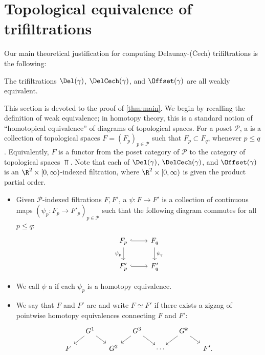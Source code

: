 \section{Topological equivalence of trifiltrations}\label{sec:top_equiv}
Our main theoretical justification for computing Delaunay-(\v Cech) trifiltrations is the following:  
%
\begin{theorem}\label{thm:main} The trifiltrations $\Del(\gamma)$, $\DelCech(\gamma)$, and $\Offset(\gamma)$  are all weakly equivalent.
\end{theorem}
%
This section is devoted to the proof of \cref{thm:main}.  We begin by recalling the definition of weak equivalence; in homotopy theory, this is a standard notion of ``homotopical equivalence'' of diagrams of topological spaces.  
For a poset $\mathcal{P}$, a  is a collection of topological spaces $F=(F_p)_{p \in \mathcal{P}}$ 
such that $F_p \subset F_q$, whenever $p \leq q$.  
Equivalently, $F$ is a functor from the poset category of $\mathcal{P}$ to the category of topological spaces $\Top$.   Note that each of $\Del(\gamma)$, $\DelCech(\gamma)$, and $\Offset(\gamma)$ is an $\R^2\times [0,\infty)$-indexed filtration, where $\R^2\times [0,\infty)$ is given the product partial order.  
%
\begin{definition}\label{def:top_equiv}\mbox{}
\begin{itemize}
\item[(i)] Given  $\mathcal{P}$-indexed filtrations $F,F'$, a  $\psi\colon F\to F'$ is a collection 
 of continuous maps $(\psi_p:F_p \to F'_p)_{p \in \mathcal{P}}$ such that the following diagram commutes for all $p\leq q$:
 \[
\begin{tikzcd}
    F_p \arrow[r, hook] \arrow[d,"\psi_p",swap] & F_q \arrow[d,"\psi_q"] \\
    F'_p \arrow[r, hook] & F'_q
\end{tikzcd} \]
\item[(ii)] We call $\psi$ a  if each $\psi_p$ is a homotopy equivalence.  
\item[(iii)] We say that $F$ and $F'$ are  and write $F\simeq F'$ if there exists a zigzag of pointwise homotopy equivalences connecting $F$ and $F'$:
\[
\begin{tikzcd}[row sep=small, column sep=small]
 & G^1 \arrow[dr] \arrow[dl] & & G^3  \arrow[dr] \arrow[dl] & & G^k  \arrow[dr] \arrow[dl] & \\
F  & & G^2 & & \cdots & & F'.
\end{tikzcd}
\]
\end{itemize}
\end{definition}
